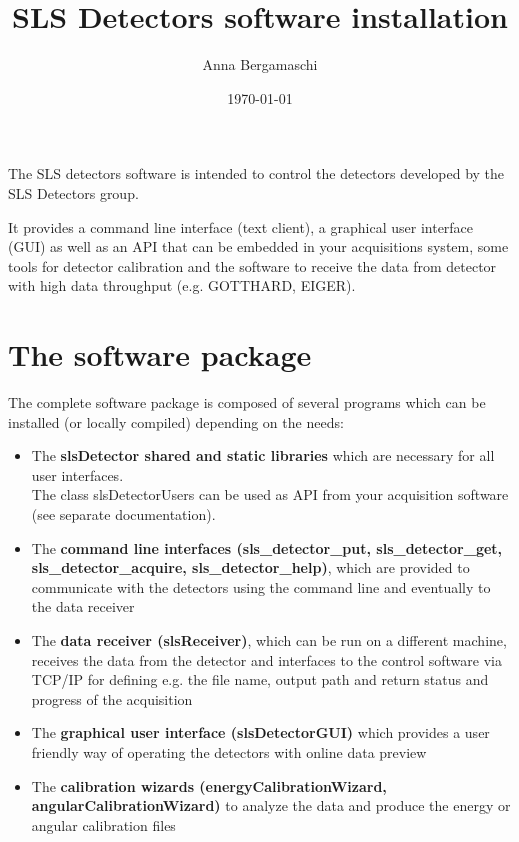 \documentclass{article}
\begin{document}
\title{SLS Detectors software installation}
\author{Anna Bergamaschi}
\date{\today}
\maketitle
\tableofcontents
\clearpage




The SLS detectors software is intended to control the detectors developed by the SLS Detectors group.

It provides a command line interface (text client), a graphical user interface (GUI) as well as an API that can be embedded in your acquisitions system, some tools for detector calibration and the software to receive the data from detector with high data throughput (e.g. GOTTHARD, EIGER).



\section{The software package}


The complete software package is composed of several programs which can be installed (or locally compiled) depending on the needs:

\begin{itemize}
\item The \textbf{slsDetector shared and static libraries} which are necessary for all user interfaces. \\
  The class slsDetectorUsers can be used as API from your acquisition software (see separate documentation).
\item The \textbf{command line interfaces (sls\_detector\_put, sls\_detector\_get, sls\_detector\_acquire, sls\_detector\_help)}, which are provided to communicate with the detectors using the command line and eventually to the data receiver
\item The \textbf{data receiver (slsReceiver)}, which can be run on a different machine, receives the data from the detector and interfaces to the control software via TCP/IP for defining e.g. the file name, output path and return status and progress of the acquisition
\item The  \textbf{graphical user interface (slsDetectorGUI)} which provides a user friendly way of operating the detectors with online data preview
\item The  \textbf{calibration wizards (energyCalibrationWizard, angularCalibrationWizard)} to analyze the data and produce the energy or angular calibration files
\end{itemize}
\end{document}
